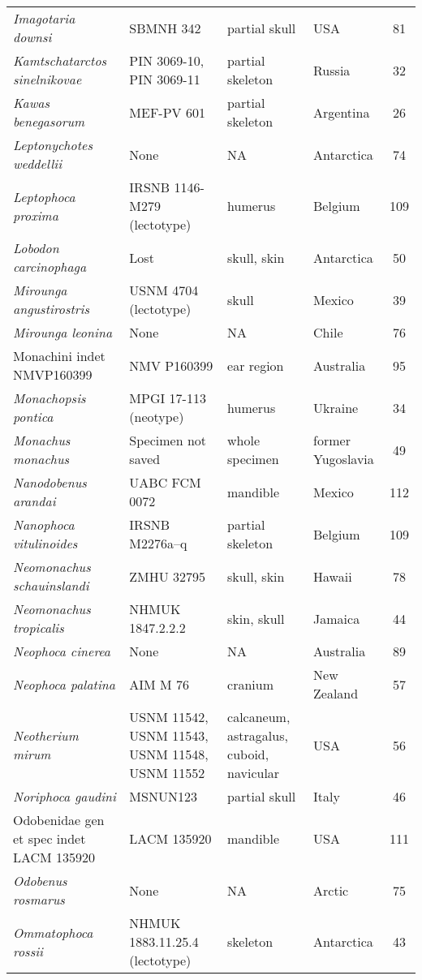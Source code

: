 \begin{longtable}{p{}p{}p{}lc}
\textit{Imagotaria downsi} &	SBMNH 342 & 	partial skull & 	USA & 81\\
\textit{Kamtschatarctos sinelnikovae} &	PIN 3069-10, PIN 3069-11 & 	partial skeleton & 	Russia & 32\\
\textit{Kawas benegasorum} &	MEF-PV 601 & 	partial skeleton & 	Argentina & 26\\
\textit{Leptonychotes weddellii} &	None & 	NA & 	Antarctica & 74\\
\textit{Leptophoca proxima} &	IRSNB 1146-M279 (lectotype) & 	humerus & 	Belgium & 109\\
\textit{Lobodon carcinophaga} &	Lost & 	skull, skin & 	Antarctica & 50\\
\textit{Mirounga angustirostris} &	USNM 4704 (lectotype) & 	skull & 	Mexico & 39\\
\textit{Mirounga leonina} &	None & 	NA & 	Chile & 76\\
Monachini indet NMVP160399	& NMV P160399 & 	ear region & 	Australia & 95\\
\textit{Monachopsis pontica} & MPGI 17-113 (neotype) & humerus & Ukraine & 34\\
\textit{Monachus monachus} &	Specimen not saved & 	whole specimen & 	former Yugoslavia & 49\\
\textit{Nanodobenus arandai} &	UABC FCM 0072 & 	mandible & 	Mexico & 112\\
\textit{Nanophoca vitulinoides} &	IRSNB M2276a–q & 	partial skeleton & 	Belgium & 109\\
\textit{Neomonachus schauinslandi} &	ZMHU 32795 & 	skull, skin & 	Hawaii & 78\\
\textit{Neomonachus tropicalis} &	NHMUK 1847.2.2.2 & 	skin, skull & 	Jamaica & 44\\
\textit{Neophoca cinerea} &	None & 	NA & 	Australia & 89\\
\textit{Neophoca palatina} &	AIM M 76 & 	cranium & 	New Zealand & 57\\
\textit{Neotherium mirum} &	USNM 11542, USNM 11543, USNM 11548, USNM 11552 & calcaneum, astragalus, cuboid, navicular & 	USA & 56\\
\textit{Noriphoca gaudini} & MSNUN123 & 	partial skull & 	Italy & 46\\
Odobenidae gen et spec indet LACM 135920 &	LACM 135920 & 	mandible & 	USA & 111\\
\textit{Odobenus rosmarus} &	None & 	NA & 	Arctic & 75\\
\textit{Ommatophoca rossii} &	NHMUK 1883.11.25.4 (lectotype) & 	skeleton & 	Antarctica & 43\\

\end{longtable}
